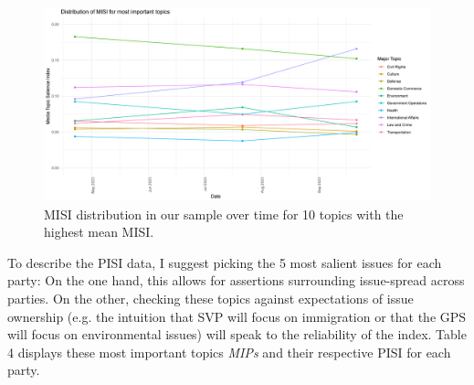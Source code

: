 \documentclass[11pt,a4paper]{article}
\begin{document}
\begin{figure}
    \centering
    \includegraphics[width=1\linewidth]{output/plots/plot_figure_5.png}
    \caption{MISI distribution in our sample over time for 10 topics with the highest mean MISI.}
    \label{fig:enter-label}
\end{figure}

To describe the PISI data, I suggest picking the 5 most salient issues for each party: On the one hand, this allows for assertions surrounding issue-spread across parties. On the other, checking these topics against expectations of issue ownership (e.g. the intuition that SVP will focus on immigration or that the GPS will focus on environmental issues) will speak to the reliability of the index. Table 4 displays these most important topics \textit{MIPs} and their respective PISI for each party.
\end{document}
